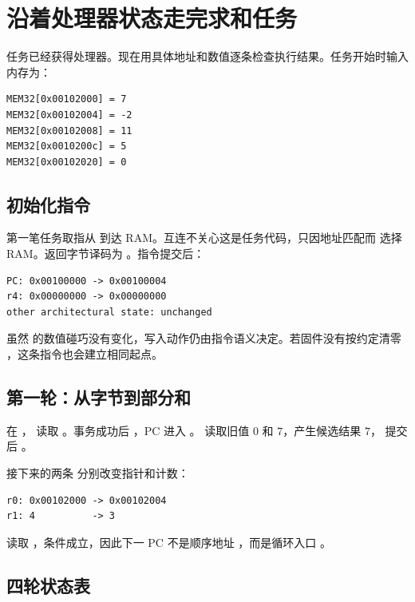 \section{沿着处理器状态走完求和任务}

任务已经获得处理器。现在用具体地址和数值逐条检查执行结果。任务开始时输入内存为：

\begin{lstlisting}
MEM32[0x00102000] = 7
MEM32[0x00102004] = -2
MEM32[0x00102008] = 11
MEM32[0x0010200c] = 5
MEM32[0x00102020] = 0
\end{lstlisting}

\subsection{初始化指令}

第一笔任务取指从  到达 RAM。互连不关心这是任务代码，只因地址匹配而
选择 RAM。返回字节译码为 。指令提交后：

\begin{lstlisting}
PC: 0x00100000 -> 0x00100004
r4: 0x00000000 -> 0x00000000
other architectural state: unchanged
\end{lstlisting}

虽然  的数值碰巧没有变化，写入动作仍由指令语义决定。若固件没有按约定清零
，这条指令也会建立相同起点。

\subsection{第一轮：从字节到部分和}

在 ， 读取
。事务成功后 ，PC 进入
。 读取旧值 \(0\) 和 \(7\)，产生候选结果 \(7\)，
提交后 。

接下来的两条  分别改变指针和计数：

\begin{lstlisting}
r0: 0x00102000 -> 0x00102004
r1: 4          -> 3
\end{lstlisting}

 读取 ，条件成立，因此下一 PC 不是顺序地址
，而是循环入口 。

\subsection{四轮状态表}

